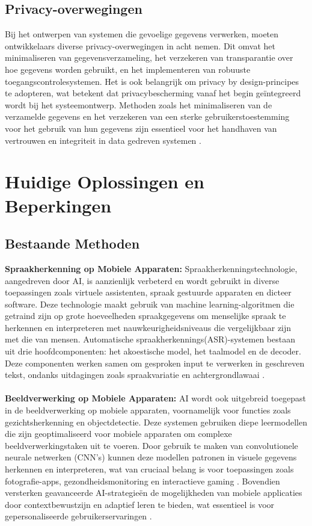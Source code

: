 \subsection{Privacy-overwegingen}

Bij het ontwerpen van systemen die gevoelige gegevens verwerken, moeten ontwikkelaars diverse privacy-overwegingen in acht nemen. Dit omvat het minimaliseren van gegevensverzameling, het verzekeren van transparantie over hoe gegevens worden gebruikt, en het implementeren van robuuste toegangscontrolesystemen. Het is ook belangrijk om privacy by design-principes te adopteren, wat betekent dat privacybescherming vanaf het begin geïntegreerd wordt bij het systeemontwerp. Methoden zoals het minimaliseren van de verzamelde gegevens en het verzekeren van een sterke gebruikerstoestemming voor het gebruik van hun gegevens zijn essentieel voor het handhaven van vertrouwen en integriteit in data gedreven systemen \autocite{Edwards2019}.


\section{Huidige Oplossingen en Beperkingen}

\subsection{Bestaande Methoden}

\textbf{Spraakherkenning op Mobiele Apparaten:}
Spraakherkenningstechnologie, aangedreven door AI, is aanzienlijk verbeterd en wordt gebruikt in diverse toepassingen zoals virtuele assistenten, spraak gestuurde apparaten en dicteer software. Deze technologie maakt gebruik van machine learning-algoritmen die getraind zijn op grote hoeveelheden spraakgegevens om menselijke spraak te herkennen en interpreteren met nauwkeurigheidsniveaus die vergelijkbaar zijn met die van mensen. Automatische spraakherkennings(ASR)-systemen bestaan uit drie hoofdcomponenten: het akoestische model, het taalmodel en de decoder. Deze componenten werken samen om gesproken input te verwerken in geschreven tekst, ondanks uitdagingen zoals spraakvariatie en achtergrondlawaai \autocite{Wang2023}.
\\ \\
\textbf{Beeldverwerking op Mobiele Apparaten:}
AI wordt ook uitgebreid toegepast in de beeldverwerking op mobiele apparaten, voornamelijk voor functies zoals gezichtsherkenning en objectdetectie. Deze systemen gebruiken diepe leermodellen die zijn geoptimaliseerd voor mobiele apparaten om complexe beeldverwerkingstaken uit te voeren. Door gebruik te maken van convolutionele neurale netwerken (CNN's) kunnen deze modellen patronen in visuele gegevens herkennen en interpreteren, wat van cruciaal belang is voor toepassingen zoals fotografie-apps, gezondheidsmonitoring en interactieve gaming \autocite{Luo2018}. Bovendien versterken geavanceerde AI-strategieën de mogelijkheden van mobiele applicaties door contextbewustzijn en adaptief leren te bieden, wat essentieel is voor gepersonaliseerde gebruikerservaringen \autocite{Sarker2021}.


